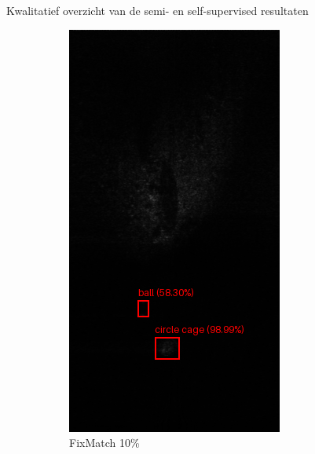 \documentclass[aspectratio=169]{beamer}
\begin{document}
\begin{frame}{Kwalitatief overzicht van de semi- en self-supervised resultaten}
\begin{figure}
            \begin{subfigure}{.2\textwidth}
                \centering
                \captionsetup{justification=centering}
                \includegraphics[width=0.9\linewidth]{1_fixmatch_10pct.png}
                \caption{FixMatch 10\%}
            \end{subfigure}%
            \begin{subfigure}{.2\textwidth}
                \centering
                \captionsetup{justification=centering}

\end{subfigure}
\end{figure}
\end{frame}
\end{document}
